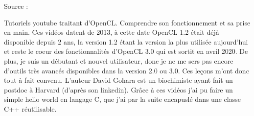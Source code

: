 \documentclass[notitlepage, a4paper, 12pt]{report}
\begin{document}
\begin{flushleft}
Source    :\newline

Tutoriels youtube traitant d'OpenCL.\newline
Comprendre son fonctionnement et sa prise en main.\newline
Ces vidéos datent de 2013, à cette date OpenCL 1.2 était déjà disponible depuis 2 ans, la version 1.2 étant la version la plus utilisée aujourd'hui et reste le coeur des fonctionnalités d'OpenCL 3.0 qui est sortit en avril 2020. De plus, je suis un débutant et nouvel utilisateur, donc je ne me sers pas encore d'outils très avancés disponibles dans la version 2.0 ou 3.0.
Ces leçons m'ont donc tout à fait convenu.
L'auteur David Gohara est un biochimiste ayant fait un postdoc à Harvard (d'après son linkedin).
Grâce à ces vidéos j'ai pu faire un simple hello world en langage C, que j'ai par la suite encapuslé dans une classe C++ réutilisable.

\end{flushleft}
\end{document}
